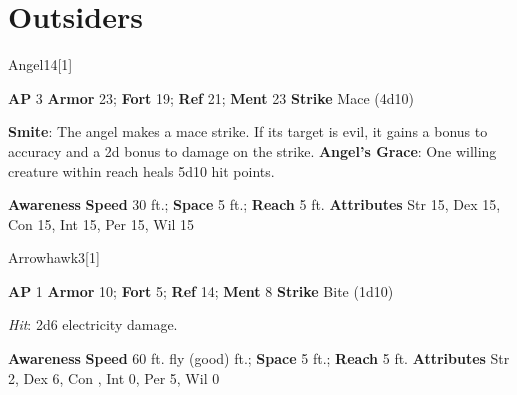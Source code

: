 \section{Outsiders}
\begin{monsection}{Angel}{14}[1]
\vspace{-1em}\vspace{-1em}
\begin{spellcontent}
\begin{spelltargetinginfo}
{\textbf{AP} 3}
\pari \textbf{Armor} 23;
\textbf{Fort} 19;
\textbf{Ref} 21;
\textbf{Ment} 23
\pari \textbf{Strike} Mace  (4d10)
\end{spelltargetinginfo}
\begin{spelleffects}
\pari
\textbf{Smite}:
The angel makes a mace strike.
If its target is evil, it gains a  bonus to accuracy and a \plus2d bonus to damage on the strike.
\vspace{0.5em}
\pari
\textbf{Angel's Grace}:
One willing creature within reach heals 5d10 hit points.
\end{spelleffects}
\end{spellcontent}
\begin{spellsubcontent}
\begin{spellfooter}
\pari \textbf{Awareness} 
\pari \textbf{Speed} 30 ft.;
\textbf{Space} 5 ft.;
\textbf{Reach} 5 ft.
\pari \textbf{Attributes}
Str 15,
Dex 15,
Con 15,
Int 15,
Per 15,
Wil 15
\end{spellfooter}
\end{spellsubcontent}
\end{monsection}
\begin{monsection}{Arrowhawk}{3}[1]
\vspace{-1em}\vspace{-1em}
\begin{spellcontent}
\begin{spelltargetinginfo}
{\textbf{AP} 1}
\pari \textbf{Armor} 10;
\textbf{Fort} 5;
\textbf{Ref} 14;
\textbf{Ment} 8
\pari \textbf{Strike} Bite  (1d10)
\end{spelltargetinginfo}
\begin{spelleffects}
\pari
{}
\par
\par \textit{Hit}: 2d6 electricity damage.
\end{spelleffects}
\end{spellcontent}
\begin{spellsubcontent}
\begin{spellfooter}
\pari \textbf{Awareness} 
\pari \textbf{Speed} 60 ft. fly (good) ft.;
\textbf{Space} 5 ft.;
\textbf{Reach} 5 ft.
\pari \textbf{Attributes}
Str 2,
Dex 6,
Con ,
Int 0,
Per 5,
Wil 0
\end{spellfooter}
\end{spellsubcontent}
\end{monsection}
